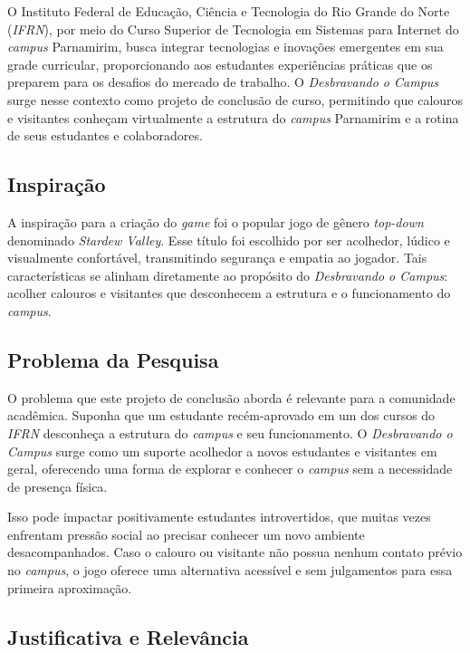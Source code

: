\documentclass[12pt, a4paper]{article}
\begin{document}
\bigbreak

O Instituto Federal de Educação, Ciência e Tecnologia do Rio Grande do Norte
(\textit{IFRN}), por meio do Curso Superior de Tecnologia em Sistemas para Internet
do \textit{campus} Parnamirim, busca integrar tecnologias e inovações emergentes em
sua grade curricular, proporcionando aos estudantes experiências práticas que os
preparem para os desafios do mercado de trabalho. O \textit{Desbravando o Campus}
surge nesse contexto como projeto de conclusão de curso, permitindo que calouros e
visitantes conheçam virtualmente a estrutura do \textit{campus} Parnamirim e a rotina
de seus estudantes e colaboradores.


\subsection{Inspiração}

A inspiração para a criação do \textit{game} foi o popular jogo de gênero
\textit{top-down} denominado \textit{Stardew Valley}. Esse título foi escolhido
por ser acolhedor, lúdico e visualmente confortável, transmitindo segurança e
empatia ao jogador. Tais características se alinham diretamente ao propósito do
\textit{Desbravando o Campus}: acolher calouros e visitantes que desconhecem a
estrutura e o funcionamento do \textit{campus}.

\subsection{Problema da Pesquisa}

O problema que este projeto de conclusão aborda é relevante para a comunidade acadêmica.
Suponha que um estudante recém-aprovado em um dos cursos do \textit{IFRN} desconheça
a estrutura do \textit{campus} e seu funcionamento. O \textit{Desbravando o Campus}
surge como um suporte acolhedor a novos estudantes e visitantes em geral, oferecendo
uma forma de explorar e conhecer o \textit{campus} sem a necessidade de presença física.

Isso pode impactar positivamente estudantes introvertidos, que muitas vezes enfrentam
pressão social ao precisar conhecer um novo ambiente desacompanhados. Caso o calouro
ou visitante não possua nenhum contato prévio no \textit{campus}, o jogo oferece uma
alternativa acessível e sem julgamentos para essa primeira aproximação.

\newpage

\subsection{Justificativa e Relevância}
\end{document}
